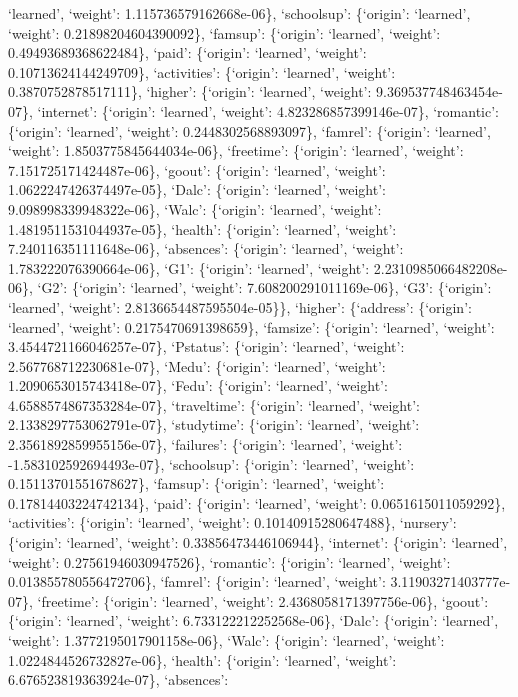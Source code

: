 \documentclass[
]{article}
\begin{document}
`learned', `weight': 1.115736579162668e-06\}, `schoolsup': \{`origin':
`learned', `weight': 0.21898204604390092\}, `famsup': \{`origin':
`learned', `weight': 0.49493689368622484\}, `paid': \{`origin':
`learned', `weight': 0.10713624144249709\}, `activities': \{`origin':
`learned', `weight': 0.3870752878517111\}, `higher': \{`origin':
`learned', `weight': 9.369537748463454e-07\}, `internet': \{`origin':
`learned', `weight': 4.823286857399146e-07\}, `romantic': \{`origin':
`learned', `weight': 0.2448302568893097\}, `famrel': \{`origin':
`learned', `weight': 1.8503775845644034e-06\}, `freetime': \{`origin':
`learned', `weight': 7.151725171424487e-06\}, `goout': \{`origin':
`learned', `weight': 1.0622247426374497e-05\}, `Dalc': \{`origin':
`learned', `weight': 9.098998339948322e-06\}, `Walc': \{`origin':
`learned', `weight': 1.4819511531044937e-05\}, `health': \{`origin':
`learned', `weight': 7.240116351111648e-06\}, `absences': \{`origin':
`learned', `weight': 1.783222076390664e-06\}, `G1': \{`origin':
`learned', `weight': 2.2310985066482208e-06\}, `G2': \{`origin':
`learned', `weight': 7.608200291011169e-06\}, `G3': \{`origin':
`learned', `weight': 2.8136654487595504e-05\}\}, `higher': \{`address':
\{`origin': `learned', `weight': 0.2175470691398659\}, `famsize':
\{`origin': `learned', `weight': 3.4544721166046257e-07\}, `Pstatus':
\{`origin': `learned', `weight': 2.567768712230681e-07\}, `Medu':
\{`origin': `learned', `weight': 1.2090653015743418e-07\}, `Fedu':
\{`origin': `learned', `weight': 4.6588574867353284e-07\}, `traveltime':
\{`origin': `learned', `weight': 2.1338297753062791e-07\}, `studytime':
\{`origin': `learned', `weight': 2.3561892859955156e-07\}, `failures':
\{`origin': `learned', `weight': -1.583102592694493e-07\}, `schoolsup':
\{`origin': `learned', `weight': 0.15113701551678627\}, `famsup':
\{`origin': `learned', `weight': 0.17814403224742134\}, `paid':
\{`origin': `learned', `weight': 0.0651615011059292\}, `activities':
\{`origin': `learned', `weight': 0.10140915280647488\}, `nursery':
\{`origin': `learned', `weight': 0.33856473446106944\}, `internet':
\{`origin': `learned', `weight': 0.27561946030947526\}, `romantic':
\{`origin': `learned', `weight': 0.013855780556472706\}, `famrel':
\{`origin': `learned', `weight': 3.11903271403777e-07\}, `freetime':
\{`origin': `learned', `weight': 2.4368058171397756e-06\}, `goout':
\{`origin': `learned', `weight': 6.733122212252568e-06\}, `Dalc':
\{`origin': `learned', `weight': 1.3772195017901158e-06\}, `Walc':
\{`origin': `learned', `weight': 1.0224844526732827e-06\}, `health':
\{`origin': `learned', `weight': 6.676523819363924e-07\}, `absences':
\end{document}
